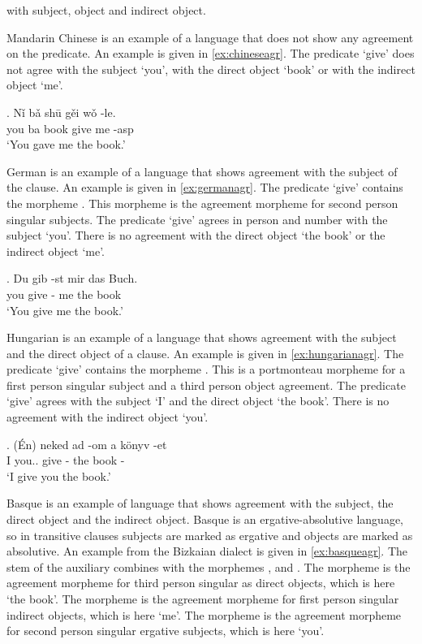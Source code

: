 \citealt{moravcsik1978} with subject, object and indirect object.

Mandarin Chinese is an example of a language that does not show any agreement on the predicate. An example is given in \ref{ex:chineseagr}. The predicate  `give' does not agree with the subject  `you', with the direct object  `book' or with the indirect object  `me'.

\exg. Nǐ bǎ shū gěi wǒ -le.\\
 you ba book give me -\ac{asp}\\
 `You gave me the book.' \label{ex:chineseagr}

German is an example of a language that shows agreement with the subject of the clause. An example is given in \ref{ex:germanagr}. The predicate  `give' contains the morpheme . This morpheme is the agreement morpheme for second person singular subjects. The predicate  `give' agrees in person and number with the subject  `you'. There is no agreement with the direct object  `the book' or the indirect object  `me'.

\exg. Du gib -st mir das Buch.\\
 you give - me the book\\
 `You give me the book.' \label{ex:germanagr}

Hungarian is an example of a language that shows agreement with the subject and the direct object of a clause. An example is given in \ref{ex:hungarianagr}. The predicate  `give' contains the morpheme . This is a portmonteau morpheme for a first person singular subject and a third person object agreement. The predicate  `give' agrees with the subject  `I' and the direct object  `the book'. There is no agreement with the indirect object  `you'.

\exg. (Én) neked ad -om a könyv -et\\
 I you.. give - the book -\\
 `I give you the book.' \label{ex:hungarianagr}

Basque is an example of language that shows agreement with the subject, the direct object and the indirect object. Basque is an ergative-absolutive language, so in transitive clauses subjects are marked as ergative and objects are marked as absolutive. An example from the Bizkaian dialect is given in \ref{ex:basqueagr}. The stem of the auxiliary  combines with the morphemes ,  and . The morpheme  is the agreement morpheme for third person singular as direct objects, which is here  `the book'. The morpheme  is the agreement morpheme for first person singular indirect objects, which is here  `me'. The morpheme  is the agreement morpheme for second person singular ergative subjects, which is here  `you'.

